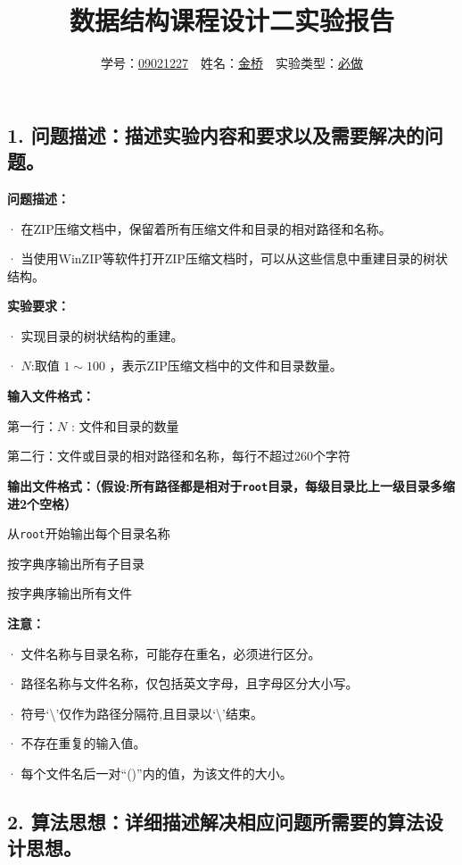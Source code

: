 \documentclass[a4paper]{ctexart}
\title{数据结构课程设计二实验报告}
\author{学号：\underline{09021227}\ \ 姓名：\underline{金桥}\ \ 实验类型：\underline{必做}}
\begin{document}
\maketitle

\subsection*{1. 问题描述：描述实验内容和要求以及需要解决的问题。\\ }

\noindent \textbf{问题描述：}

· 在ZIP压缩文档中，保留着所有压缩文件和目录的相对路径和名称。

· 当使用WinZIP等软件打开ZIP压缩文档时，可以从这些信息中重建目录的树状结构。

\noindent \textbf{实验要求：}

· 实现目录的树状结构的重建。

· $N$:取值 $1 \sim 100$ ，表示ZIP压缩文档中的文件和目录数量。

\noindent \textbf{输入文件格式：}

第一行：$N$ : 文件和目录的数量

第二行：文件或目录的相对路径和名称，每行不超过260个字符

\noindent \textbf{输出文件格式：\small{（假设:所有路径都是相对于\texttt{root}目录，每级目录比上一级目录多缩进2个空格）}}

从\texttt{root}开始输出每个目录名称

\hspace*{2em} 按字典序输出所有子目录

\hspace*{2em} \hspace*{2em} 按字典序输出所有文件

\noindent \textbf{注意：}

· 文件名称与目录名称，可能存在重名，必须进行区分。

· 路径名称与文件名称，仅包括英文字母，且字母区分大小写。

· 符号‘\textbackslash’仅作为路径分隔符,且目录以‘\textbackslash’结束。

· 不存在重复的输入值。

· 每个文件名后一对“()”内的值，为该文件的大小。

\subsection*{2. 算法思想：详细描述解决相应问题所需要的算法设计思想。}
\end{document}
